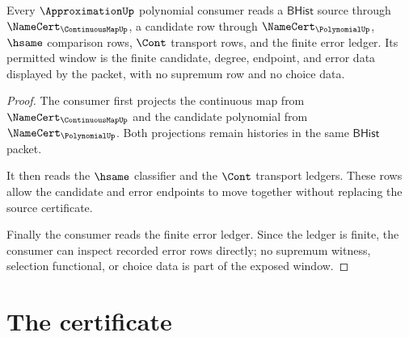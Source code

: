 \begin{theorem}
\label{thm:approximation-polynomial-consumer-window}
Every $\ApproximationUp$ polynomial consumer reads a $\mathsf{BHist}$ source
through $\NameCert_{\ContinuousMapUp}$, a candidate row through
$\NameCert_{\PolynomialUp}$, $\hsame$ comparison rows, $\Cont$ transport rows,
and the finite error ledger. Its permitted window is the finite candidate,
degree, endpoint, and error data displayed by the packet, with no supremum row
and no choice data.
\end{theorem}
\begin{proof}
The consumer first projects the continuous map from
$\NameCert_{\ContinuousMapUp}$ and the candidate polynomial from
$\NameCert_{\PolynomialUp}$. Both projections remain histories in the same
$\mathsf{BHist}$ packet.

It then reads the $\hsame$ classifier and the $\Cont$ transport ledgers. These
rows allow the candidate and error endpoints to move together without replacing
the source certificate.

Finally the consumer reads the finite error ledger. Since the ledger is finite,
the consumer can inspect recorded error rows directly; no supremum witness,
selection functional, or choice data is part of the exposed window.
\end{proof}

\section{The certificate}
\label{sec:approximation-certificate}

